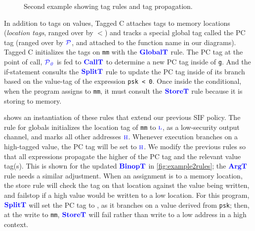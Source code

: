 \documentclass{llncs}
\begin{document}
\begin{figure}[t]
\caption{Second example showing tag rules and tag propagation.}
\label{fig:ex2}
\end{figure}

In addition to tags on values, Tagged C attaches tags to memory locations ({\em location tags}, ranged over by
\(\lt\)) and tracks a special global tag called the PC tag (ranged over by \(\PCT\), and attached to the
function name in our diagrams).
Tagged C initializes the tags on {\tt mm} with the \(\globaltname\) rule. The PC tag
at the point of call, \(\PCT[_0]\) is fed to \(\calltname\) to determine a new PC tag
inside of {\tt g}.
And the if-statement consults the \(\splittname\) rule to update the PC tag
inside of its branch based on the value-tag of the expression {\tt psk < 0}. Once inside the
conditional, when the program assigns to {\tt mm}, it must consult the \(\storetname\) rule because
it is storing to memory.%

 shows an instantiation of these rules that extend our previous SIF policy.
The rule for globals initializes the location tag of {\tt mm} to \(\low\),
as a low-security output channel, and marks all other addresses \(\high\).
Whenever execution branches on
a high-tagged value, the PC tag will be set to \(\high\). We modify the previous rules so that
all expressions propagate the higher of the PC tag and the relevant value tag(s). This is shown
for the updated \(\binoptname\) in \cref{fig:example2rules}; the \(\argtname\) rule needs a similar
adjustment.
When an assignment is to a memory location, the store rule will check the tag on
that location against the value being written, 
and failstop if a high value would be written to a low location.
For this program, \(\splittname\) will set the PC tag to \high, as it branches on a value derived
from {\tt psk}; 
then, at the write to {\tt mm}, \(\storetname\) will fail rather than write to a low address
in a high context.
\end{document}
